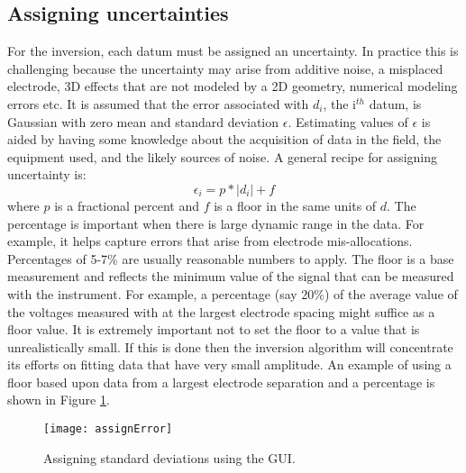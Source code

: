 \subsection{Assigning uncertainties}
For the inversion, each datum must be assigned an uncertainty. In practice this is challenging because the uncertainty may arise from additive noise, a misplaced electrode, 3D effects that are not modeled by a 2D geometry, numerical modeling errors etc. It is assumed that the error associated with $d_i$, the i$^{th}$ datum, is Gaussian with zero mean and standard deviation $\epsilon$. Estimating values of $\epsilon$ is aided by having some knowledge about the acquisition of data in the field, the equipment used, and the likely sources of noise. A general recipe for assigning uncertainty is:
%
\begin{equation}
\epsilon_i = p*|d_i| + f
\end{equation}
%
where $p$ is a fractional percent and $f$ is a floor in the same units of $d$. The percentage is important when there is large dynamic range in the data. For example, it helps capture errors that arise from electrode mis-allocations. Percentages of 5-7\% are usually reasonable numbers to apply. The floor is a base measurement and reflects the minimum value of the signal that can be measured with the instrument. For example, a percentage (say 20\%) of the average value of the voltages measured with at the largest electrode spacing might suffice as a floor value. It is extremely important not to set the floor to a value that is unrealistically small. If this is done then the inversion algorithm will concentrate its efforts on fitting data that have very small amplitude. An example of using a floor based upon data from a largest electrode separation and a percentage is shown in Figure \ref{fig:DCVscreen}.
%
\begin{figure}[hb]
\centering
\texttt{[image: assignError]}
\caption{Assigning standard deviations using the  GUI.}
\label{fig:DCVscreen}
\end{figure}
%
